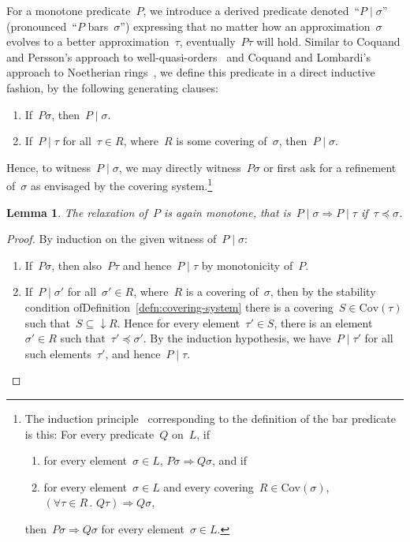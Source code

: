 \documentclass[com,11pt,crcready]{iosart2x}
\theoremstyle{definition}
\theoremstyle{plain}
\newtheorem{lemma}[definition]{Lemma}
\theoremstyle{remark}
\newcommand{\?}{\,{:}\,}
\newcommand{\Cov}{\mathrm{Cov}}
\renewcommand{\_}{\mathpunct{.}\,}
\begin{document}
For a monotone predicate~$P$, we introduce a derived predicate denoted~``$P
\mid \sigma$'' (pronounced~``$P$ bars~$\sigma$'') expressing that no matter how an approximation~$\sigma$ evolves
to a better approximation~$\tau$, eventually~$P\tau$ will hold. Similar to
Coquand and Persson's approach to well-quasi-orders~\cite[Definition~6]{coquand-persson:groebner} and
Coquand and Lombardi's approach to Noetherian
rings~\cite{coquand-lombardi:krull,coquand:invariant}, we define this predicate
in a direct inductive fashion, by the following generating clauses:
\begin{enumerate}
\item If~$P\sigma$, then~$P \mid \sigma$.
\item If~$P \mid \tau$ for all~$\tau \in R$, where~$R$ is some covering
of~$\sigma$, then~$P \mid \sigma$.
\end{enumerate}
Hence, to witness~$P \mid \sigma$, we may directly witness~$P\sigma$ or first
ask for a refinement of~$\sigma$ as envisaged by the covering
system.\footnote{The induction
principle~\cite{aczel-rathjen:notes,aczel-rathjen:cstdraft,rathjen:genind,aczel:ind} corresponding to the definition of the
bar predicate is this: For every predicate~$Q$ on~$L$, if
\begin{enumerate}
\item for every element~$\sigma \in L$, $P\sigma \Rightarrow Q\sigma$, and if
\item for every element~$\sigma \in L$ and every covering~$R \in \Cov(\sigma)$,
$(\forall \tau \in R\_ Q\tau) \Rightarrow Q\sigma$,
\end{enumerate}
then~$P\sigma \Rightarrow Q\sigma$ for every element~$\sigma \in L$.}

\begin{lemma}The relaxation of~$P$ is again monotone, that is~$P \mid \sigma
\Rightarrow P \mid \tau$ if~$\tau \preceq \sigma$.\end{lemma}

\begin{proof}By induction on the given witness of~$P \mid \sigma$:
\begin{enumerate}
\item If~$P\sigma$, then also~$P\tau$ and hence~$P \mid \tau$ by
monotonicity of~$P$.
\item If~$P \mid \sigma'$ for all~$\sigma' \in R$, where~$R$ is a covering
of~$\sigma$, then by the stability condition
ofDefinition~\ref{defn:covering-system} there is a covering~$S \in \Cov(\tau)$
such that~$S \subseteq {\downarrow}R$. Hence for every element~$\tau' \in S$,
there is an element~$\sigma' \in R$ such that~$\tau' \preceq \sigma'$. By the
induction hypothesis, we have~$P \mid \tau'$ for all such elements~$\tau'$, and
hence~$P \mid \tau$. \qedhere
\end{enumerate}
\end{proof}
\end{document}
